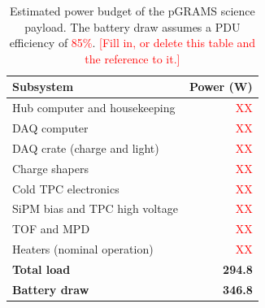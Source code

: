 \documentclass[a4paper,fleqn,longmktitle]{cas-dc}
\begin{document}
\begin{table}[width=\linewidth,cols=2,pos=h]
\small
\caption{Estimated power budget of the pGRAMS science payload. The battery draw assumes a PDU efficiency of \textcolor{red}{85\%}. \textcolor{red}{[Fill in, or delete this table and the reference to it.]}}
\label{tab:pGRAMS_power}
\begin{tabular*}{\tblwidth}{@{} LR@{} }
\toprule
\textbf{Subsystem} & \textbf{Power (W)} \\
\midrule
Hub computer and housekeeping & \textcolor{red}{XX} \\
DAQ computer & \textcolor{red}{XX} \\
DAQ crate (charge and light) & \textcolor{red}{XX} \\
Charge shapers & \textcolor{red}{XX} \\
Cold TPC electronics & \textcolor{red}{XX} \\
SiPM bias and TPC high voltage & \textcolor{red}{XX} \\
TOF and MPD & \textcolor{red}{XX} \\
Heaters (nominal operation) & \textcolor{red}{XX} \\
\midrule
\textbf{Total load} & \textbf{294.8} \\
\textbf{Battery draw} & \textbf{346.8} \\
\bottomrule
\end{tabular*}
\end{table}
 
\end{document}
